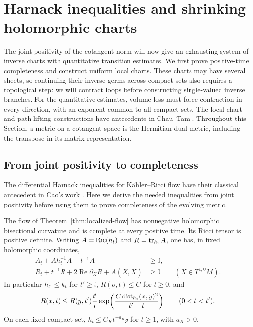 \section{Harnack inequalities and shrinking holomorphic charts}
\label{sec:charts}

The joint positivity of the cotangent norm will now give an exhausting
system of inverse charts with quantitative transition estimates.
We first prove positive-time completeness and construct uniform local
charts.  These charts may have several sheets, so continuing their
inverse germs across compact sets also requires a topological step:
we will contract loops before constructing single-valued inverse branches.
For the quantitative estimates, volume loss must force contraction in
every direction, with an exponent common to all compact sets.
The local chart and path-lifting constructions have antecedents in Chau--Tam
\cite[Section~2]{ChauTamSimply}\cite[Sections~2--3]{ChauTamStein}.
Throughout this Section, a metric on a cotangent space is the Hermitian
dual metric, including the transpose in its matrix representation.

\subsection{From joint positivity to completeness}

The differential Harnack inequalities for K\"ahler--Ricci flow have
their classical antecedent in Cao's work \cite{CaoHarnack}.
Here we derive the needed inequalities from joint positivity before
using them to prove completeness of the evolving metric.

\begin{proposition}\label{prop:harnack-completeness}
The flow of Theorem~\ref{thm:localized-flow} has nonnegative holomorphic
bisectional curvature and is complete at every positive time.  Its
Ricci tensor is positive definite.  Writing $A=\operatorname{Ric}(h_t)$ and
$R=\operatorname{tr}_{h_t}A$, one has, in fixed holomorphic coordinates,
\begin{align}
 A_t+A h_t^{-1}A+t^{-1}A&\ge0,
 \label{chart:matrix-harnack}\\
 R_t+t^{-1}R+2\operatorname{Re}\partial_XR+A(X,\overline X)&\ge0
 \qquad(X\in T^{1,0}M).
 \label{chart:scalar-harnack}
\end{align}
In particular $h_{t'}\le h_t$ for $t'\ge t$, $R(o,t)\le C$ for
$t\ge0$, and
\begin{equation}\label{chart:integrated-harnack}
 R(x,t)\le R(y,t')\frac{t'}t
 \exp\!\left(\frac{C\operatorname{dist}_{h_t}(x,y)^2}{t'-t}\right)
 \qquad(0<t<t').
\end{equation}
On each fixed compact set, $h_t\le C_Kt^{-a_K}g$ for $t\ge1$, with
$a_K>0$.
\end{proposition}

